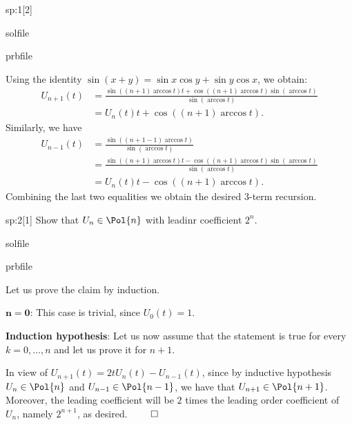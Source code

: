 \begin{samproblem}
\begin{subproblem}{sp:1}[2]
\begin{samwriteprbpart}{solfile}
\begin{writeverbatim}{prbfile}
\begin{samsolution}
        Using the identity $\sin (x+y) = \sin x \cos y + \sin y \cos x$, we obtain:
        \begin{align*}
          U_{n+1}(t)   &= \frac{\sin((n+1)\arccos t)t + \cos((n+1)\arccos t) \sin (\arccos t)}{\sin(\arccos t)} \\
            & = U_n(t) t+\cos((n+1)\arccos t).
        \end{align*}
        Similarly, we have
        \begin{align*}
          U_{n-1}(t)&=\frac{\sin((n+1 -1 )\arccos t)}{\sin(\arccos t)} \\ 
            &= \frac{\sin((n+1)\arccos t)t - \cos((n+1)\arccos t) \sin (\arccos t)}{\sin(\arccos t)}\\
            & = U_n(t) t-\cos((n+1)\arccos t).
        \end{align*}
        Combining the last two equalities we obtain the desired 3-term recursion.
     \end{samsolution}
    \end{writeverbatim}
  \end{samwriteprbpart}

\end{subproblem}


\begin{subproblem}{sp:2}[1]
  Show that $U_n\in \Pol{n}$ with leadinr coefficient $2^n$.
  \begin{samwriteprbpart}{solfile}
    \begin{writeverbatim}{prbfile}
      \begin{samsolution}
        Let us prove the claim by induction. 
        
        $\mathbf{n=0}$: This case is trivial, since $U_0(t)=1$. 
        
        \textbf{Induction hypothesis}: Let us now assume that the statement is true for every $k=0,\dots,n$ and let us prove it for $n+1$. 
        
        In view of $U_{n+1}(t)=2tU_n(t)-U_{n-1}(t)$, since by inductive hypothesis $U_n\in\Pol{n}$ and $U_{n-1}\in\Pol{n-1}$, 
        we have that $U_{n+1}\in \Pol{{n+1}}$. Moreover, the leading coefficient will be $2$ times the leading order coefficient 
        of $U_n$, namely $2^{n+1}$, as desired. \hspace{11cm} $\qed$

     \end{samsolution}
    \end{writeverbatim}
  \end{samwriteprbpart}


\end{subproblem}
\end{samproblem}
